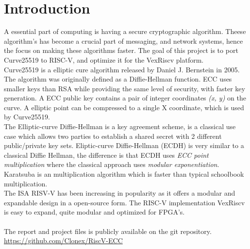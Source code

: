 \section{Introduction}
A essential part of computing is having a secure cryptographic algorithm. Theese algorithm's has become a crucial part of messaging, and network systems, hence the focus on making these algorithms faster.
The goal of this project is to port Curve25519 to RISC-V, and optimize it for the VexRiscv platform.
\\
Curve25519 is a elliptic cure algorithm released by Daniel J. Bernstein in 2005. The algorithm was originally defined as a Diffie-Hellman function.
ECC uses smaller keys than RSA while providing the same level of security, with faster key generation.
A ECC public key contains a pair of integer coordinates \textit{(x, y)} on the curve. A elliptic point can be compressed to a single X coordinate, which is used by Curve25519.
\\
The Elliptic-curve Diffie-Hellman is a key agreement scheme, is a classical use case which allows two parties to establish a shared secret with 2 different public/private key sets. 
Eliptic-curve Diffie-Hellman (ECDH) is very similar to a classical Diffie Hellman, the difference is that ECDH uses \textit{ECC point multiplication} where the classical approach uses \textit{modular exponentiation}.\\
Karatsuba is an multiplication algorithm which is faster than typical schoolbook multiplication. \\
The ISA RISV-V has been increasing in popularity as it offers a modular and expandable design in a open-source form. The RISC-V implementation VexRiscv is easy to expand, quite modular and optimized for FPGA's.\\
\\
The report and project files is publicly available on the git repository.\\
\href{https://github.com/Clonex/RiscV-ECC}{https://github.com/Clonex/RiscV-ECC}
\pagebreak